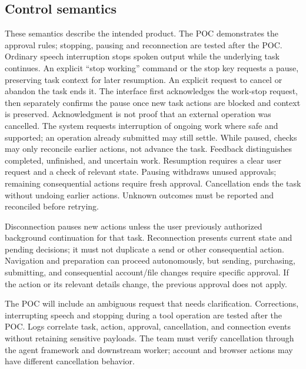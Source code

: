 \documentclass[11pt]{article}
\begin{document}
\subsection{Control semantics}
These semantics describe the intended product. The POC demonstrates the approval
rules; stopping, pausing and reconnection are tested after the POC.
Ordinary speech interruption stops spoken output while the underlying task
continues. An explicit ``stop working'' command or the stop key requests a pause,
preserving task context for later resumption. An explicit request to cancel or
abandon the task ends it. The interface first acknowledges the work-stop request,
then separately confirms the pause once new task actions are blocked and context
is preserved. Acknowledgment is not proof that an external operation was cancelled.
The system requests interruption of ongoing work where safe and supported;
an operation already submitted may still settle. While paused, checks may only
reconcile earlier actions, not advance the task. Feedback distinguishes completed,
unfinished, and uncertain work. Resumption requires a clear user request and a
check of relevant state. Pausing withdraws unused approvals; remaining consequential
actions require fresh approval. Cancellation ends the task without undoing earlier
actions. Unknown outcomes must be reported and reconciled before retrying.

Disconnection pauses new actions unless the user previously authorized background
continuation for that task. Reconnection presents current state and pending
decisions; it must not duplicate a send or other consequential action. Navigation
and preparation can proceed autonomously, but sending, purchasing, submitting,
and consequential account/file changes require specific approval. If the action
or its relevant details change, the previous approval does not apply.

The POC will include an ambiguous request that needs clarification. Corrections,
interrupting speech and stopping during a tool operation are tested after the POC. Logs correlate task, action,
approval, cancellation, and connection events without retaining sensitive payloads.
The team must verify cancellation through the agent framework and downstream worker;
account and browser actions may have different cancellation behavior.
\end{document}

